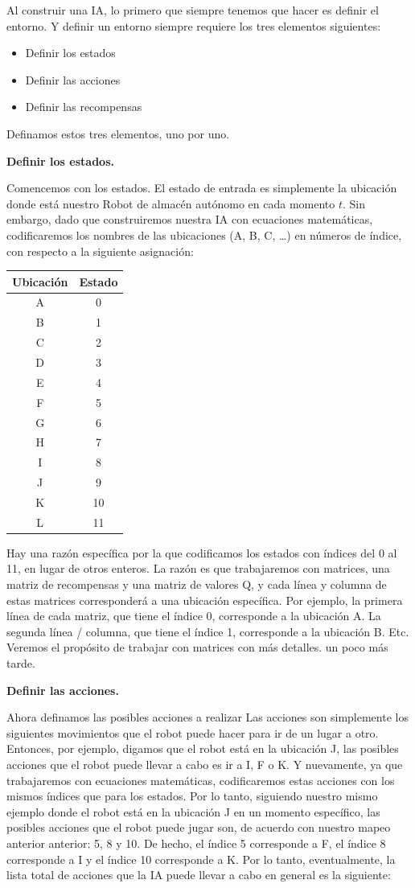 \documentclass[]{book}
\providecommand{\tightlist}{%
  \setlength{\itemsep}{0pt}\setlength{\parskip}{0pt}}
\begin{document}
Al construir una IA, lo primero que siempre tenemos que hacer es definir el entorno. Y definir un entorno siempre requiere los tres elementos siguientes:

\begin{itemize}
\tightlist
\item
  Definir los estados
\item
  Definir las acciones
\item
  Definir las recompensas
\end{itemize}

Definamos estos tres elementos, uno por uno.

\textbf{Definir los estados.}

Comencemos con los estados. El estado de entrada es simplemente la ubicación donde está nuestro Robot de almacén autónomo en cada momento \(t\). Sin embargo, dado que construiremos nuestra IA con ecuaciones matemáticas, codificaremos los nombres de las ubicaciones (A, B, C, \ldots{}) en números de índice, con respecto a la siguiente asignación:

\begin{longtable}[]{@{}cc@{}}
\toprule
\textbf{Ubicación} & \textbf{Estado}\tabularnewline
\midrule
\endhead
A & 0\tabularnewline
B & 1\tabularnewline
C & 2\tabularnewline
D & 3\tabularnewline
E & 4\tabularnewline
F & 5\tabularnewline
G & 6\tabularnewline
H & 7\tabularnewline
I & 8\tabularnewline
J & 9\tabularnewline
K & 10\tabularnewline
L & 11\tabularnewline
\bottomrule
\end{longtable}

Hay una razón específica por la que codificamos los estados con índices del 0 al 11, en lugar de otros enteros. La razón es que trabajaremos con matrices, una matriz de recompensas y una matriz de valores Q, y cada línea y columna de estas matrices corresponderá a una ubicación específica. Por ejemplo, la primera línea de cada matriz, que tiene el índice 0, corresponde a la ubicación A. La segunda línea / columna, que tiene el índice 1, corresponde a la ubicación B. Etc. Veremos el propósito de trabajar con matrices con más detalles. un poco más tarde.

\textbf{Definir las acciones.}

Ahora definamos las posibles acciones a realizar Las acciones son simplemente los siguientes movimientos que el robot puede hacer para ir de un lugar a otro. Entonces, por ejemplo, digamos que el robot está en la ubicación J, las posibles acciones que el robot puede llevar a cabo es ir a I, F o K. Y nuevamente, ya que trabajaremos con ecuaciones matemáticas, codificaremos estas acciones con los mismos índices que para los estados. Por lo tanto, siguiendo nuestro mismo ejemplo donde el robot está en la ubicación J en un momento específico, las posibles acciones que el robot puede jugar son, de acuerdo con nuestro mapeo anterior anterior: 5, 8 y 10. De hecho, el índice 5 corresponde a F, el índice 8 corresponde a I y el índice 10 corresponde a K. Por lo tanto, eventualmente, la lista total de acciones que la IA puede llevar a cabo en general es la siguiente:
\end{document}
